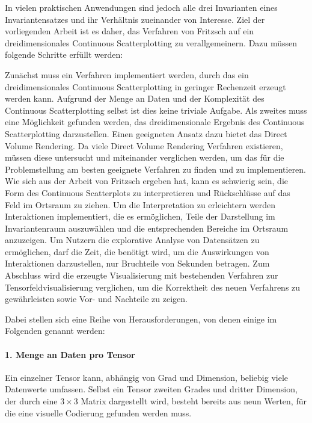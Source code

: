 \documentclass[a4paper,fontsize=12pt,toc=bib,parskip=half,ngerman]{scrartcl}
\begin{document}
In vielen praktischen Anwendungen sind jedoch alle drei Invarianten eines Invariantensatzes und ihr Verh\"altnis zueinander von Interesse. Ziel der vorliegenden Arbeit ist es daher, das Verfahren von Fritzsch auf ein dreidimensionales Continuous Scatterplotting zu verallgemeinern. Dazu m\"ussen folgende Schritte erf\"ullt werden:

Zun\"achst muss ein Verfahren implementiert werden, durch das ein dreidimensionales Continuous Scatterplotting in geringer Rechenzeit erzeugt werden kann. Aufgrund der Menge an Daten und der Komplexit\"at des Continuous Scatterplotting selbst ist dies keine triviale Aufgabe. Als zweites muss eine M\"oglichkeit gefunden werden, das dreidimensionale Ergebnis des Continuous Scatterplotting darzustellen. Einen geeigneten Ansatz dazu bietet das Direct Volume Rendering. Da viele Direct Volume Rendering Verfahren existieren, m\"ussen diese untersucht und miteinander verglichen werden, um das f\"ur die Problemstellung am besten geeignete Verfahren zu finden und zu implementieren. Wie sich aus der Arbeit von Fritzsch ergeben hat, kann es schwierig sein, die Form des Continuous Scatterplots zu interpretieren und R\"uckschl\"usse auf das Feld im Ortsraum zu ziehen. Um die Interpretation zu erleichtern werden Interaktionen implementiert, die es erm\"oglichen, Teile der Darstellung im Invariantenraum auszuw\"ahlen und die entsprechenden Bereiche im Ortsraum anzuzeigen. Um Nutzern die explorative Analyse von Datens\"atzen zu erm\"oglichen, darf die Zeit, die ben\"otigt wird, um die Auswirkungen von Interaktionen darzustellen, nur Bruchteile von Sekunden betragen. Zum Abschluss wird die erzeugte Visualisierung mit bestehenden Verfahren zur Tensorfeldvisualisierung verglichen, um die Korrektheit des neuen Verfahrens zu gew\"ahrleisten sowie Vor- und Nachteile zu zeigen.

Dabei stellen sich eine Reihe von Herausforderungen, von denen einige im Folgenden genannt werden\cite{fritzsch2016continuousScatterplot,hlawitschka2014top}:

\paragraph{1. Menge an Daten pro Tensor}
Ein einzelner Tensor kann, abh\"angig von Grad und Dimension, beliebig viele Datenwerte umfassen. Selbst ein Tensor zweiten Grades und dritter Dimension, der durch eine $3 \times 3$ Matrix dargestellt wird, besteht bereits aus neun Werten, f\"ur die eine visuelle Codierung gefunden werden muss.
\end{document}
